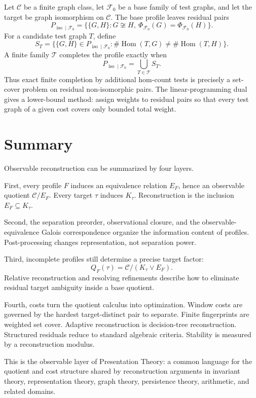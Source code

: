 \documentclass[11pt]{article}
\theoremstyle{definition}
\theoremstyle{remark}
\begin{document}
Let \(\mathcal C\) be a finite graph class, let \(\mathcal F_0\) be a base family of test graphs, and let the target be graph isomorphism on \(\mathcal C\).  The base profile leaves residual pairs
\[
P_{\operatorname{iso}\mid\mathcal F_0}
=
\{\{G,H\}:G\not\cong H,\ \Phi_{\mathcal F_0}(G)=\Phi_{\mathcal F_0}(H)\}.
\]
For a candidate test graph \(T\), define
\[
S_T=\{\{G,H\}\in P_{\operatorname{iso}\mid\mathcal F_0}:
\#\operatorname{Hom}(T,G)\neq \#\operatorname{Hom}(T,H)\}.
\]
A finite family \(\mathcal T\) completes the profile exactly when
\[
P_{\operatorname{iso}\mid\mathcal F_0}
=
\bigcup_{T\in\mathcal T}S_T.
\]
Thus exact finite completion by additional hom-count tests is precisely a set-cover problem on residual non-isomorphic pairs.  The linear-programming dual gives a lower-bound method: assign weights to residual pairs so that every test graph of a given cost covers only bounded total weight.

\section{Summary}

Observable reconstruction can be summarized by four layers.

First, every profile \(F\) induces an equivalence relation \(E_F\), hence an observable quotient \(\mathcal C/E_F\).  Every target \(\tau\) induces \(K_\tau\).  Reconstruction is the inclusion \(E_F\subseteq K_\tau\).

Second, the separation preorder, observational closure, and the observable-equivalence Galois correspondence organize the information content of profiles.  Post-processing changes representation, not separation power.

Third, incomplete profiles still determine a precise target factor:
\[
Q_F(\tau)=\mathcal C/(K_\tau\vee E_F).
\]
Relative reconstruction and resolving refinements describe how to eliminate residual target ambiguity inside a base quotient.

Fourth, costs turn the quotient calculus into optimization.  Window costs are governed by the hardest target-distinct pair to separate.  Finite fingerprints are weighted set cover.  Adaptive reconstruction is decision-tree reconstruction.  Structured residuals reduce to standard algebraic criteria.  Stability is measured by a reconstruction modulus.

This is the observable layer of Presentation Theory: a common language for the quotient and cost structure shared by reconstruction arguments in invariant theory, representation theory, graph theory, persistence theory, arithmetic, and related domains.
\end{document}
